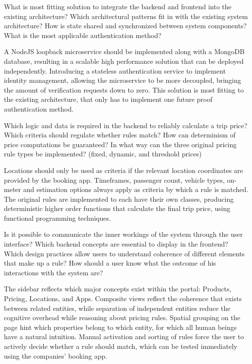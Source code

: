 What is most fitting solution to integrate the backend and frontend into the existing architecture?
Which architectural patterns fit in with the existing system architecture?
How is state shared and synchronized between system components?
What is the most applicable authentication method?

A NodeJS loopback microservice should be implemented along with a MongoDB database, resulting in a scalable high performance solution that can be deployed independently. Introducing a stateless authentication service to implement identity management, allowing the microservice to be more decoupled, bringing the amount of verification requests down to zero. This solution is most fitting to the existing architecture, that only has to implement one future proof authentication method.

Which logic and data is required in the backend to reliably calculate a trip price?
Which criteria should regulate whether rules match?
How can determinism of price computations be guaranteed?
In what way can the three original pricing rule types be implemented? (fixed, dynamic, and threshold prices)

Locations should only be used as criteria if the relevant location coordinates are provided by the booking app. Timeframes, passenger count, vehicle types, on-meter and estimation options always apply as criteria by which a rule is matched. The original rules are implemented to each have their own classes, producing deterministic higher order functions that calculate the final trip price, using functional programming techniques.


Is it possible to communicate the inner workings of the system through the user interface?
Which backend concepts are essential to display in the frontend?
Which design practices allow users to understand coherence of different elements that make up a rule?
How should a user know what the outcome of his interactions with the system are?

The sidebar reflects which major concepts exist within the portal: Products, Pricing, Locations, and Apps. Composite views reflect the coherence that exists between related entities, while separation of independent entities reduce the cognitive overhead while reasoning about pricing rules. Spatial grouping on the page hint which properties belong to which entity, for which all human beings have a natural intuition. Manual activation and sorting of rules force the user to actively decide whether a rule should match, which can be tested immediately using the companies' booking app.